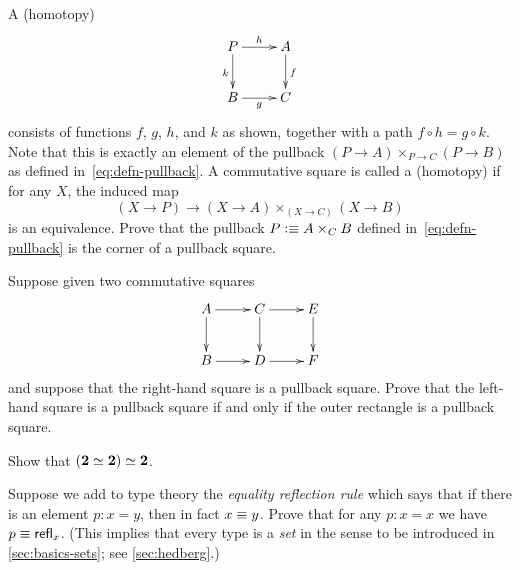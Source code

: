 \begin{ex}\label{ex:pullback}
  A (homotopy) 
  \begin{equation*}
  \vcenter{\xymatrix{
      P\ar[r]^h\ar[d]_k &
      A\ar[d]^f\\
      B\ar[r]_g &
      C
      }}
  \end{equation*}
  consists of functions $f$, $g$, $h$, and $k$ as shown, together with a path $f \circ h= g \circ k$.
  Note that this is exactly an element of the pullback $(P\to A) \times_{P\to C} (P\to B)$ as defined in~\eqref{eq:defn-pullback}.
  A commutative square is called a (homotopy) 
  if for any $X$, the induced map
  \[ (X\to P) \to (X\to A) \times_{(X\to C)} (X\to B) \]
  is an equivalence.
  Prove that the pullback $P \vcentcolon\equiv A\times_C B$ defined in~\eqref{eq:defn-pullback} is the corner of a pullback square.
\end{ex}

\begin{ex}\label{ex:pullback-pasting}
  Suppose given two commutative squares
  \begin{equation*}
    \vcenter{\xymatrix{
        A\ar[r]\ar[d] &
        C\ar[r]\ar[d] &
        E\ar[d]\\
        B\ar[r] &
        D\ar[r] &
        F
      }}
  \end{equation*}
  and suppose that the right-hand square is a pullback square.
  Prove that the left-hand square is a pullback square if and only if the outer rectangle is a pullback square.
\end{ex}

\begin{ex}\label{ex:eqvboolbool}
  Show that $(\mathbf{2} \simeq \mathbf{2}) \simeq \mathbf{2}$.
\end{ex}

\begin{ex}\label{ex:equality-reflection}
  Suppose we add to type theory the \emph{equality reflection rule} which says that if there is an element $p:x=y$, then in fact $x\equiv y$.
  Prove that for any $p:x=x$ we have $p\equiv \mathsf{refl}_{x}$.
  (This implies that every type is a \emph{set} in the sense to be introduced in \autoref{sec:basics-sets}; see \autoref{sec:hedberg}.)
\end{ex}

